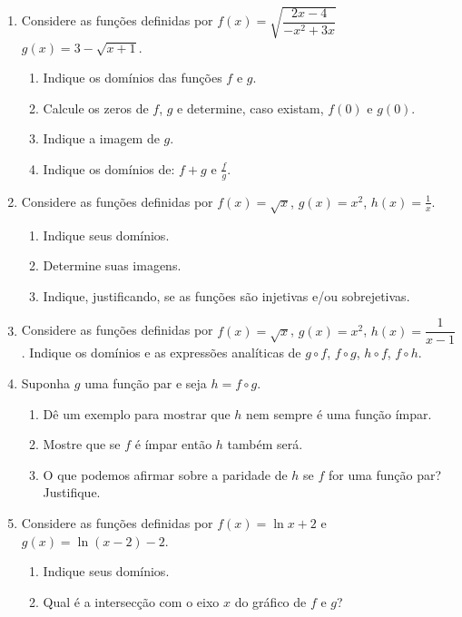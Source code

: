 \begin{enumerate}


\item Considere as funções definidas por $f(x)=\sqrt{\dfrac{2x-4}{-x^2+3x}}$ \quad {}\quad $g(x) = 3-\sqrt{x+1}$.

\begin{enumerate}
\item Indique os domínios das funções $f$ e $g$.
\item Calcule os zeros de $f$, $g$ e determine, caso existam, $f(0)$ e $g(0)$.
\item Indique a imagem de $g$.
\item Indique os domínios de: $f+g$ e $\frac{f}{g}$.
\end{enumerate}

\item Considere as funções definidas por $f(x)=\sqrt{x}$, $g(x)=x^2$, $h(x)=\frac{1}{x}$.
\begin{enumerate}
    \item Indique seus domínios.
    \item Determine suas imagens.
    \item Indique, justificando, se as funções são injetivas e/ou sobrejetivas.
\end{enumerate}

\item Considere as funções definidas por $f(x)=\sqrt{x}$, $g(x)=x^2$, $h(x)=\dfrac{1}{x-1}$. Indique os domínios e as expressões analíticas de $g\circ f$, $f\circ g$, $h\circ f$, $f\circ h$.

\item Suponha $g$ uma função par e seja $h = f \circ g.$
  \begin{enumerate}
    \item Dê um exemplo para mostrar que $h$ nem sempre é uma função ímpar.
    \item Mostre que se $f$ é ímpar então $h$ também será.
    \item  O que podemos afirmar sobre a paridade de  $h$ se $f$  for uma função par? Justifique.
    \end{enumerate}


\item Considere as funções definidas por $f(x)=\ln{x+2}$ e $g(x)=\ln(x-2)-2$.
\begin{enumerate}
    \item Indique seus domínios.
    \item Qual é a intersecção com o eixo $x$ do gráfico de $f$ e $g$?
\end{enumerate}


\end{enumerate}
